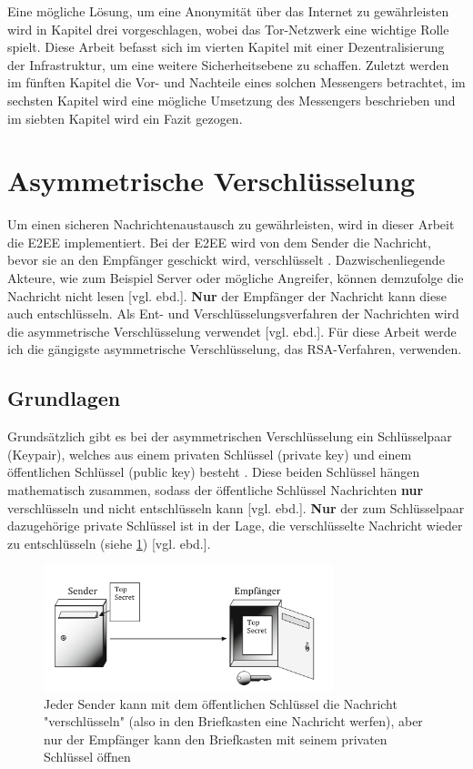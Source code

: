 \documentclass[a4paper,ngerman, headheight=28pt,12pt]{scrartcl}
\newcommand{\vcite}[1]{\cite[vgl.][]{#1}}
\newcommand{\vebd}{[vgl. ebd.]}
\begin{document}
Eine mögliche Lösung, um eine Anonymität über das Internet zu gewährleisten wird in Kapitel drei vorgeschlagen, wobei das Tor-Netzwerk eine wichtige Rolle spielt.
Diese Arbeit befasst sich im vierten Kapitel mit einer Dezentralisierung der Infrastruktur, um eine weitere Sicherheitsebene zu schaffen.
Zuletzt werden im fünften Kapitel die Vor- und Nachteile eines solchen Messengers betrachtet, im sechsten Kapitel wird eine mögliche Umsetzung des Messengers beschrieben und im siebten Kapitel wird ein Fazit gezogen.



\section{Asymmetrische Verschlüsselung}
Um einen sicheren Nachrichtenaustausch zu gewährleisten, wird in dieser Arbeit die E2EE implementiert. Bei der E2EE wird von dem Sender die Nachricht, bevor sie an den Empfänger geschickt wird, verschlüsselt \vcite{E2EE}. Dazwischenliegende Akteure, wie zum Beispiel Server oder mögliche Angreifer, können demzufolge die Nachricht nicht lesen \vebd. \textbf{Nur} der Empfänger der Nachricht kann diese auch entschlüsseln. Als Ent- und Verschlüsselungsverfahren der Nachrichten wird die asymmetrische Verschlüsselung verwendet \vebd.
Für diese Arbeit werde ich die gängigste asymmetrische Verschlüsselung, das RSA-Verfahren, verwenden.
\subsection{Grundlagen}
Grundsätzlich gibt es bei der asymmetrischen Verschlüsselung ein Schlüsselpaar (Keypair), welches aus einem privaten Schlüssel (private key) und einem öffentlichen Schlüssel (public key) besteht \vcite{Rsa-Basics}. Diese beiden Schlüssel hängen mathematisch zusammen, sodass der öffentliche Schlüssel Nachrichten \textbf{nur} verschlüsseln und nicht entschlüsseln kann \vebd. \textbf{Nur} der zum Schlüsselpaar dazugehörige private Schlüssel ist in der Lage, die verschlüsselte Nachricht wieder zu entschlüsseln (siehe \cref{fig:E2EE}) \vebd.

\begin{figure}[h]
  \centering
  \includegraphics[width=0.75\textwidth]{Briefkasten-asymm.png}
  \caption{Jeder Sender kann mit dem öffentlichen Schlüssel die Nachricht "verschlüsseln" (also in den Briefkasten eine Nachricht werfen), aber nur der Empfänger kann den Briefkasten mit seinem privaten Schlüssel öffnen \vcite{fig:Rsa-Cryptography} \label{fig:E2EE}}
\end{figure}
\end{document}
